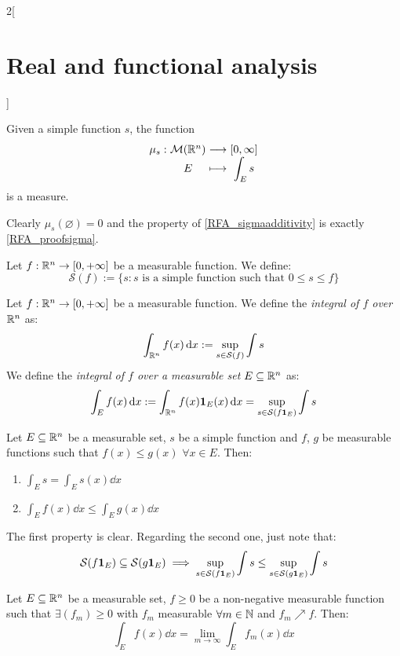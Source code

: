 \documentclass[../../../main_math.tex]{subfiles}
\begin{document}
\begin{multicols}{2}[\section{Real and functional analysis}]
\begin{proposition}
    Given a simple function $s$, the function $$\function{\mu_s}{\mathcal{M}(\RR^n)}{[0,\infty]}{E}{\displaystyle\int_E s}$$ is a measure.
  \end{proposition}
  \begin{sproof}
    Clearly $\mu_s(\varnothing)=0$ and the property of \ref{RFA_sigmaadditivity} is exactly \cref{RFA_proofsigma}.
  \end{sproof}
  \begin{definition}
    Let $f:\mathbb{R}^n\rightarrow[0,+\infty]$ be a measurable function. We define: $$\mathcal{S}(f):=\{s:s\text{ is a simple function such that }0\leq s\leq f\}$$
  \end{definition}
  \begin{definition}
    Let $f:\mathbb{R}^n\rightarrow[0,+\infty]$ be a measurable function. We define the \emph{integral of $f$ over $\mathbb{R}^n$} as: $$\int_{\mathbb{R}^n}f(x)\dd{x}:=\sup_{s\in\mathcal{S}(f)}\int s$$ We define the \emph{integral of $f$ over a measurable set $E\subseteq \mathbb{R}^n$} as: $$\int_{E}f(x)\dd{x}:=\int_{\mathbb{R}^n}f(x)\boldsymbol{\mathrm{1}}_{E}(x)\dd{x}=\sup_{s\in\mathcal{S}(f\boldsymbol{\mathrm{1}}_{E})}\int s$$
  \end{definition}
  \begin{proposition}
    Let $E\subseteq\mathbb{R}^n$ be a measurable set, $s$ be a simple function and $f$, $g$ be measurable functions such that $f(x)\leq g(x)$ $\forall x\in E$. Then:
    \begin{enumerate}
      \item $\displaystyle\int_E s=\int_Es(x)\dd{x}$
      \item $\displaystyle\int_E f(x)\dd{x}\leq \int_Eg(x)\dd{x}$
    \end{enumerate}
  \end{proposition}
  \begin{sproof}
    The first property is clear. Regarding the second one, just note that: $$\mathcal{S}(f\boldsymbol{\mathrm{1}}_{E})\subseteq \mathcal{S}(g\boldsymbol{\mathrm{1}}_{E})\implies \sup_{s\in\mathcal{S}(f\boldsymbol{\mathrm{1}}_{E})}\int s\leq \sup_{s\in\mathcal{S}(g\boldsymbol{\mathrm{1}}_{E})}\int s$$
  \end{sproof}
  \begin{important}
    \begin{theorem}\label{RFA_monotone}
      Let $E\subseteq\mathbb{R}^n$ be a measurable set, $f\geq 0$ be a non-negative measurable function such that $\exists (f_m)\geq 0$ with $f_m$ measurable $\forall m\in\mathbb{N}$ and $f_m\nearrow f$. Then: $$\int_Ef(x)\dd{x}=\lim_{m\to\infty}\int_Ef_m(x)\dd{x}$$
    \end{theorem}

\end{important}
\end{multicols}
\end{document}
